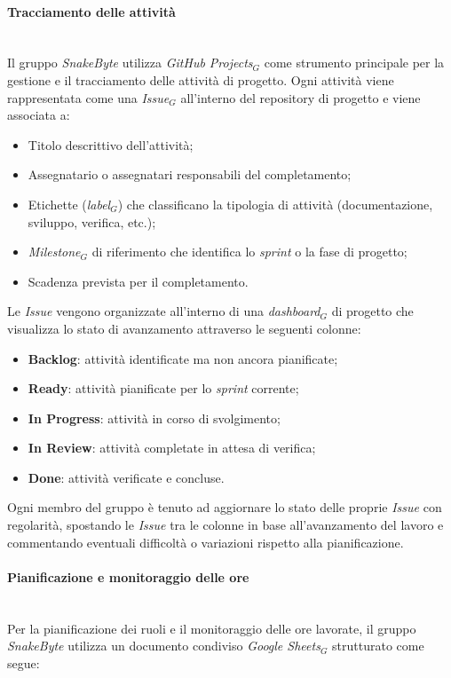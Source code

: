\documentclass[10pt, letterpaper]{article}
\newcommand{\trisubsection}[1]{\paragraph{#1}\mbox{}\\}
\begin{document}
\trisubsection{Tracciamento delle attività}
Il gruppo \textit{SnakeByte} utilizza \textit{GitHub Projects$_{G}$} come strumento principale per la gestione e il tracciamento delle attività di progetto. Ogni attività viene rappresentata come una \textit{Issue$_{G}$} all'interno del repository di progetto e viene associata a:

\begin{itemize}
    \item Titolo descrittivo dell'attività;
    \item Assegnatario o assegnatari responsabili del completamento;
    \item Etichette (\textit{label$_{G}$}) che classificano la tipologia di attività (documentazione, sviluppo, verifica, etc.);
    \item \textit{Milestone$_{G}$} di riferimento che identifica lo \textit{sprint} o la fase di progetto;
    \item Scadenza prevista per il completamento.
\end{itemize}

Le \textit{Issue} vengono organizzate all'interno di una \textit{dashboard$_{G}$} di progetto che visualizza lo stato di avanzamento attraverso le seguenti colonne:

\begin{itemize}
    \item \textbf{Backlog}: attività identificate ma non ancora pianificate;
    \item \textbf{Ready}: attività pianificate per lo \textit{sprint} corrente;
    \item \textbf{In Progress}: attività in corso di svolgimento;
    \item \textbf{In Review}: attività completate in attesa di verifica;
    \item \textbf{Done}: attività verificate e concluse.
\end{itemize}

Ogni membro del gruppo è tenuto ad aggiornare lo stato delle proprie \textit{Issue} con regolarità, spostando le \textit{Issue} tra le colonne in base all'avanzamento del lavoro e commentando eventuali difficoltà o variazioni rispetto alla pianificazione.

\trisubsection{Pianificazione e monitoraggio delle ore}
Per la pianificazione dei ruoli e il monitoraggio delle ore lavorate, il gruppo \textit{SnakeByte} utilizza un documento condiviso \textit{Google Sheets$_{G}$} strutturato come segue:
\end{document}

